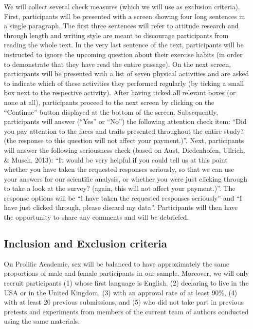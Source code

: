 \documentclass[
  doc,floatsintext]{apa6}
\begin{document}
We will collect several check measures (which we will use as exclusion criteria).
First, participants will be presented with a screen showing four long sentences in a single paragraph.
The first three sentences will refer to attitude research and through length and writing style are meant to discourage participants from reading the whole text.
In the very last sentence of the text, participants will be instructed to ignore the upcoming question about their exercise habits (in order to demonstrate that they have read the entire passage).
On the next screen, participants will be presented with a list of seven physical activities and are asked to indicate which of these activities they performed regularly (by ticking a small box next to the respective activity).
After having ticked all relevant boxes (or none at all), participants proceed to the next screen by clicking on the ``Continue'' button displayed at the bottom of the screen.
Subsequently, participants will answer (``Yes'' or ``No'') the following attention check item: ``Did you pay attention to the faces and traits presented throughout the entire study? (the response to this question will not affect your payment.)''.
Next, participants will answer the following seriousness check (based on Aust, Diedenhofen, Ullrich, \& Musch, 2013): ``It would be very helpful if you could tell us at this point whether you have taken the requested responses seriously, so that we can use your answers for our scientific analysis, or whether you were just clicking through to take a look at the survey? (again, this will not affect your payment.)''.
The response options will be ``I have taken the requested responses seriously'' and ``I have just clicked through, please discard my data''.
Participants will then have the opportunity to share any comments and will be debriefed.

\subsection{Inclusion and Exclusion criteria}\label{inclusion-and-exclusion-criteria}

On Prolific Academic, sex will be balanced to have approximately the same proportions of male and female participants in our sample.
Moreover, we will only recruit participants (1) whose first language is English, (2) declaring to live in the USA or in the United Kingdom, (3) with an approval rate of at least 90\%, (4) with at least 20 previous submissions, and (5) who did not take part in previous pretests and experiments from members of the current team of authors conducted using the same materials.
\end{document}
